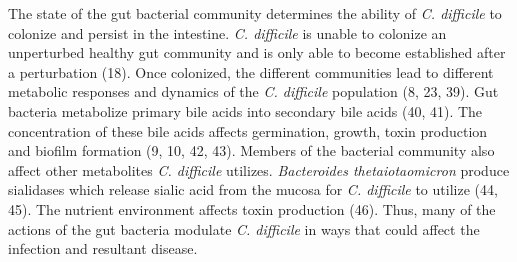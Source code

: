 \documentclass[
  12pt,
]{article}
\begin{document}
The state of the gut bacterial community determines the ability of
\emph{C. difficile} to colonize and persist in the intestine. \emph{C.
difficile} is unable to colonize an unperturbed healthy gut community
and is only able to become established after a perturbation (18). Once
colonized, the different communities lead to different metabolic
responses and dynamics of the \emph{C. difficile} population (8, 23,
39). Gut bacteria metabolize primary bile acids into secondary bile
acids (40, 41). The concentration of these bile acids affects
germination, growth, toxin production and biofilm formation (9, 10, 42,
43). Members of the bacterial community also affect other metabolites
\emph{C. difficile} utilizes. \emph{Bacteroides thetaiotaomicron}
produce sialidases which release sialic acid from the mucosa for
\emph{C. difficile} to utilize (44, 45). The nutrient environment
affects toxin production (46). Thus, many of the actions of the gut
bacteria modulate \emph{C. difficile} in ways that could affect the
infection and resultant disease.
\end{document}
